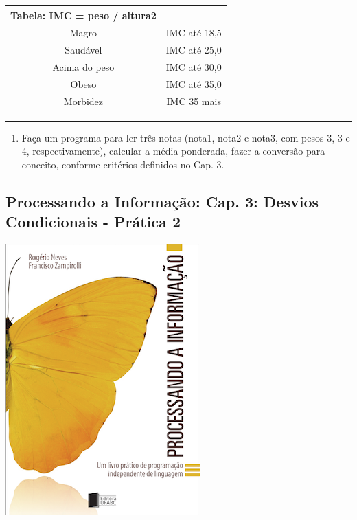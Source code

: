 \documentclass[12pt,a4paper]{article}
\renewcommand{\linethickness}{0.05em}
\providecommand{\tightlist}{%
      \setlength{\itemsep}{0pt}\setlength{\parskip}{0pt}}
\begin{document}
    \begin{longtable}[]{@{}cc@{}}
\toprule
Tabela: IMC = peso / altura2 &\tabularnewline
\midrule
\endhead
Magro & IMC até 18,5\tabularnewline
Saudável & IMC até 25,0\tabularnewline
Acima do peso & IMC até 30,0\tabularnewline
Obeso & IMC até 35,0\tabularnewline
Morbidez & IMC 35 mais\tabularnewline
\bottomrule
\end{longtable}

    \begin{center}\rule{0.5\linewidth}{\linethickness}\end{center}

\begin{enumerate}
\def\labelenumi{\arabic{enumi}.}
\setcounter{enumi}{4}
\tightlist
\item
  Faça um programa para ler três notas (nota1, nota2 e nota3, com pesos
  3, 3 e 4, respectivamente), calcular a média ponderada, fazer a
  conversão para conceito, conforme critérios definidos no Cap. 3.
\end{enumerate}

    \hypertarget{processando-a-informauxe7uxe3o-cap.-3-desvios-condicionais---pruxe1tica-2}{%
\subsection{Processando a Informação: Cap. 3: Desvios Condicionais -
Prática
2}\label{processando-a-informauxe7uxe3o-cap.-3-desvios-condicionais---pruxe1tica-2}}

    \includegraphics{"figs/Capa_Processando_Informacao.jpg"}
\end{document}
